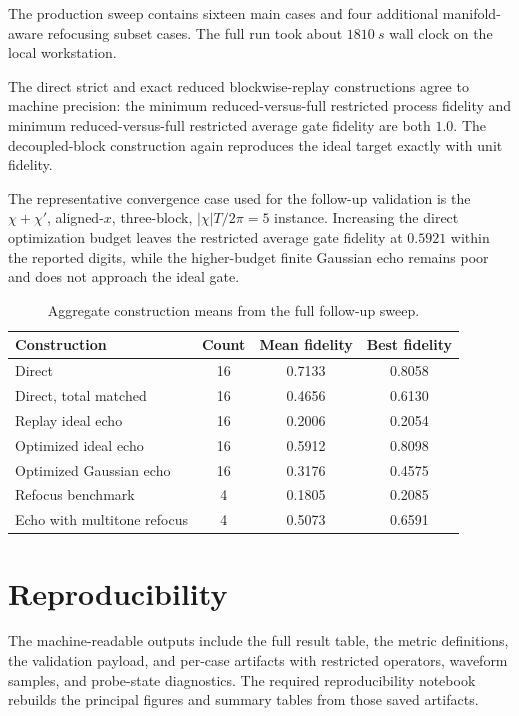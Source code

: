 \documentclass[aps,pra,twocolumn,reprint,floatfix,amsmath,amssymb]{revtex4-2}
\begin{document}
The production sweep contains sixteen main cases and four additional manifold-aware refocusing subset cases. The full run took about \(\SI{1810}{s}\) wall clock on the local workstation.

The direct strict and exact reduced blockwise-replay constructions agree to machine precision: the minimum reduced-versus-full restricted process fidelity and minimum reduced-versus-full restricted average gate fidelity are both \(1.0\). The decoupled-block construction again reproduces the ideal target exactly with unit fidelity.

The representative convergence case used for the follow-up validation is the \(\chi+\chi'\), aligned-\(x\), three-block, \(|\chi|T/2\pi=5\) instance. Increasing the direct optimization budget leaves the restricted average gate fidelity at \(0.5921\) within the reported digits, while the higher-budget finite Gaussian echo remains poor and does not approach the ideal gate.

\begin{table}[tb]
  \centering
  \scriptsize
  \caption{Aggregate construction means from the full follow-up sweep.}
  \label{tab:aggregate}
  \begin{tabular}{@{}lccc@{}}
    \toprule
    Construction & Count & Mean fidelity & Best fidelity \\
    \midrule
    Direct & 16 & 0.7133 & 0.8058 \\
    Direct, total matched & 16 & 0.4656 & 0.6130 \\
    Replay ideal echo & 16 & 0.2006 & 0.2054 \\
    Optimized ideal echo & 16 & 0.5912 & 0.8098 \\
    Optimized Gaussian echo & 16 & 0.3176 & 0.4575 \\
    Refocus benchmark & 4 & 0.1805 & 0.2085 \\
    Echo with multitone refocus & 4 & 0.5073 & 0.6591 \\
    \bottomrule
  \end{tabular}
\end{table}

\section{Reproducibility}
\label{app:repro}

The machine-readable outputs include the full result table, the metric definitions, the validation payload, and per-case artifacts with restricted operators, waveform samples, and probe-state diagnostics. The required reproducibility notebook rebuilds the principal figures and summary tables from those saved artifacts.



\end{document}
